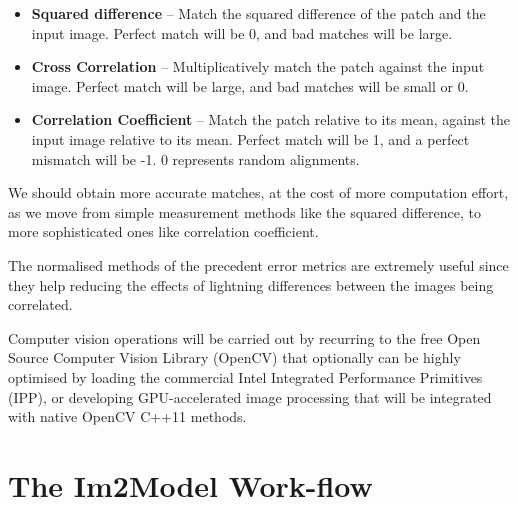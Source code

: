 \documentclass[
  oneside,
  11pt, a4paper,
  footinclude=true,
  headinclude=true,
  cleardoublepage=empty
]{scrbook}
\begin{document}
	\begin{itemize}
	    \item \textbf{Squared difference} -- Match the squared difference of the patch and the input image.
			Perfect match will be 0, and bad matches will be large.
	     \item \textbf{Cross Correlation} -- Multiplicatively match the patch against the input image.
			Perfect match will be large, and bad matches will be small or 0.
			
	     \item \textbf{Correlation Coefficient} -- Match the patch relative to its mean, against the input image relative to its mean.
			Perfect match will be 1, and a perfect mismatch will be -1. 0 represents random alignments.
	\end{itemize}
				

We should obtain more accurate matches, at the cost of more computation effort, as we move from simple measurement methods like the squared difference, to more sophisticated ones like correlation coefficient.\par
The normalised methods of the precedent error metrics are extremely useful since they help reducing the effects of lightning differences between the images being correlated.\par 


Computer vision operations will be carried out by recurring to the free Open Source Computer Vision Library (OpenCV) that optionally can be highly optimised by loading the commercial Intel Integrated Performance Primitives (IPP)\citep{ˆome2004programming}, or developing GPU-accelerated image processing that will be integrated with native OpenCV C++11 methods.




\section{The Im2Model Work-flow}
\end{document}
